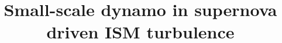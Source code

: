 \documentclass[preprint2]{aastex63}
\begin{document}
\title{Small-scale dynamo in supernova driven ISM turbulence}


\end{document}
